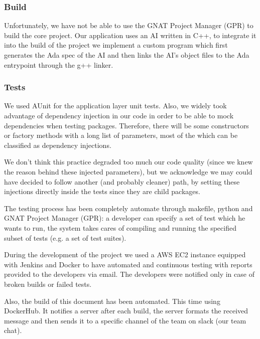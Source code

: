\subsubsection{Build}
Unfortunately, we have not be able to use the GNAT Project Manager (GPR)
to build the core project. Our application uses an AI written in C++,
to integrate it into the build of the project we implement a custom program
which first generates the Ada spec of the AI and then
links the AI's object files to the Ada entrypoint through the g++ linker.

\subsubsection{Tests}
We used AUnit for the application layer unit tests.
Also, we widely took advantage of dependency injection in our code in order to
be able to mock dependencies when testing packages. Therefore, there will be
some constructors or factory methods with a long list of parameters, most of the
which can be classified as dependency injections.

We don't think this practice degraded too much our code quality (since we knew
the reason behind these injected parameters), but we acknowledge we may could
have decided to follow another (and probably cleaner) path, by setting these
injections directly inside the tests since they are child packages.


The testing process has been completely automate through makefile, python and
GNAT Project Manager (GPR): a developer can specify a set of test which he wants
to run, the system takes cares of compiling and running the specified subset of
tests (e.g. a set of test suites).

During the development of the project we used a AWS EC2 instance
equipped with Jenkins and Docker to have automated and continuous testing with
reports provided to the developers via email. The developers were notified
only in case of broken builds or failed tests.

Also, the build of this document has been automated. This time using DockerHub.
It notifies a server after each build, the server formats the received message
and then sends it to a specific channel of the team on slack (our team chat).
